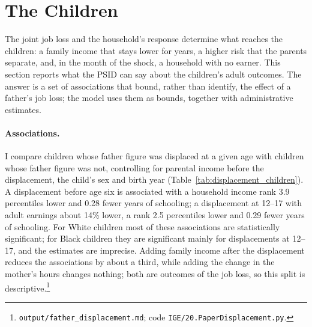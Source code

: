 \section{The Children}\label{sec:children}

The joint job loss and the household's response determine what reaches the children: a family income that stays lower
for years, a higher risk that the parents separate, and, in the month of the shock, a household with no earner. This
section reports what the PSID can say about the children's adult outcomes. The answer is a set of associations that
bound, rather than identify, the effect of a father's job loss; the model uses them as bounds, together with
administrative estimates.

\paragraph{Associations.} I compare children whose father figure was displaced at a given age with children whose
father figure was not, controlling for parental income before the displacement, the child's sex and birth year
(Table~\ref{tab:displacement_children}). A displacement before age six is associated with a household income rank 3.9
percentiles lower and 0.28 fewer years of schooling; a displacement at 12--17 with adult earnings about 14\% lower, a
rank 2.5 percentiles lower and 0.29 fewer years of schooling. For White children most of these associations are
statistically significant; for Black children they are significant mainly for displacements at 12--17, and the
estimates are imprecise. Adding family income after the displacement reduces the associations by about a third,
while adding the change in the mother's hours changes nothing; both are outcomes of the job loss, so this split is
descriptive.\footnote{\texttt{output/father\_displacement.md}; code \texttt{IGE/20.PaperDisplacement.py}.}



